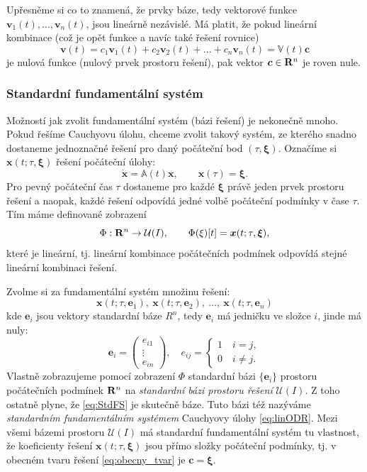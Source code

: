 \documentclass[a4paper, 12pt]{book}
\theoremstyle{definition}
\def\to{\rightarrow}
\def\Real{{\rm\bf R}}
\def\vc#1{\mathbf{\boldsymbol{#1}}}     %
\def\tn#1{{\mathbb{#1}}}    %
\def\df#1{\emph{#1}}
\begin{document}
Upřesněme si co to znamená, že prvky báze, tedy vektorové funkce $\vc v_1(t), \dots, \vc v_n(t)$, jsou lineárně nezávislé. Má platit, že pokud 
lineární kombinace (což je opět funkce a navíc také řešení rovnice) 
\[
  \vc v(t) = c_1 \vc v_1(t) + c_2 \vc v_2(t) + \dots + c_n\vc v_n(t) = \tn V(t) \vc c
\]
je nulová funkce (nulový prvek prostoru řešení), pak vektor $\vc c \in \Real^n$ je roven nule. 

\subsubsection{Standardní fundamentální systém}
Možností jak zvolit fundamentální systém (bázi řešení) je nekonečně mnoho. Pokud řešíme Cauchyovu úlohu, chceme zvolit takový systém,
ze kterého snadno dostaneme jednoznačné řešení pro daný počáteční bod $(\tau, \vc \xi)$. Označíme si
$ \vc x(t; \tau, \vc\xi) $ řešení počáteční úlohy:
\begin{equation}
    \label{eq:lin_Cauchy}
    \dot{\vc x}=\tn A(t)\vc x,\qquad \vc x(\tau)=\vc\xi.
\end{equation}
Pro pevný počáteční čas $\tau$ dostaneme pro každé $\vc\xi$ právě jeden prvek prostoru řešení a naopak, 
každé řešení odpovídá jedné volbě počáteční podmínky v čase $\tau$. Tím máme definované zobrazení
\[
   \Phi: \Real^n \to \mathcal{U}(I),\qquad \Phi(\xi)[t] = \vc x(t; \tau, \vc \xi),
\]
které je lineární, tj. lineární kombinace počátečních podmínek odpovídá stejné lineární kombinaci řešení.

Zvolme si za fundamentální systém  množinu řešení:
\begin{equation}
\label{eq:StdFS}
\vc x (t; \tau,\vc e_1),\  
\vc x (t; \tau,\vc e_2),\  
\dots,\ 
\vc x (t; \tau,\vc e_n)
\end{equation}
kde $\vc e_i$ jsou vektory standardní báze $R^n$, tedy
$\vc e_i$ má jedničku ve složce $i$, jinde má nuly:
\[
    \vc e_i = 
    \begin{pmatrix}
        e_{i1}\\ \vdots\\ e_{in}
    \end{pmatrix}
    ,\quad     
    e_{ij} = \left\{
        \begin{array}{l}
            1\quad i=j,\\
            0\quad i\ne j.
        \end{array}
        \right.
\]
Vlastně zobrazujeme pomocí zobrazení $\Phi$ standardní bázi $\{\vc e_i\}$ prostoru počátečních podmínek $\Real^n$ na \df{standardní bázi prostoru řešení} 
$\mathcal{U}(I)$. Z toho ostatně plyne, že \eqref{eq:StdFS} je skutečně báze. Tuto bázi též nazýváme \df{standardním fundamentálním 
systémem} Cauchyovy úlohy \eqref{eq:linODR}. Mezi všemi bázemi prostoru $\mathcal U(I)$ má standardní fundamentální systém tu vlastnost, že koeficienty 
řešení $\vc x(t; \tau,\vc  \xi)$ jsou přímo složky počáteční podmínky, tj. v obecném tvaru řešení \eqref{eq:obecny_tvar} je $\vc c = \vc\xi$.
\end{document}
